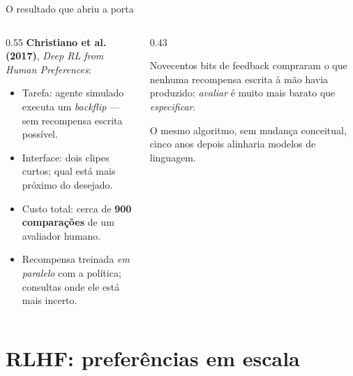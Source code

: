 \documentclass[aspectratio=169, 11pt]{beamer}
\begin{document}
\begin{frame}{O resultado que abriu a porta}

  \begin{columns}[T]
  \begin{column}{0.55\textwidth}
    \textbf{Christiano et al. (2017)}, \emph{Deep RL from Human Preferences}:
    \begin{itemize}\setlength{\itemsep}{0.3ex}
      \item Tarefa: agente simulado executa um \emph{backflip} --- sem
        recompensa escrita possível.
      \item Interface: dois clipes curtos; qual está mais próximo do desejado.
      \item Custo total: cerca de \textbf{900 comparações} de um avaliador
        humano.
      \item Recompensa treinada \emph{em paralelo} com a política; consultas
        onde ele está mais incerto.
    \end{itemize}
  \end{column}
  \begin{column}{0.43\textwidth}
    \begin{ideiabox}
      Novecentos bits de feedback compraram o que nenhuma recompensa escrita à
      mão havia produzido: \emph{avaliar} é muito mais barato que
      \emph{especificar}.
    \end{ideiabox}
    \begin{alertabox}
      O mesmo algoritmo, sem mudança conceitual, cinco anos depois alinharia
      modelos de linguagem.
    \end{alertabox}
  \end{column}
  \end{columns}
\end{frame}

\section{RLHF: preferências em escala}
\end{document}
